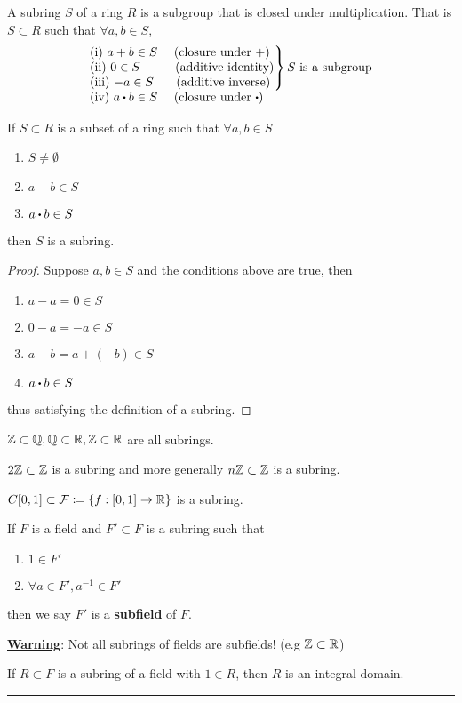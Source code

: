 \documentclass[../Main.tex]{subfiles}
\begin{document}
\begin{dfn}[title=Subring]
	A subring $S$ of a ring $R$ is a subgroup that is closed under multiplication. That is $S\subset R$ such that $\forall a,b \in S$,
	 \[\begin{tabular}{ l }
		$\left.\kern-\nulldelimiterspace
		\begin{tabular}{@{} l @{}}
		(i) $a + b \in S$ \quad (closure under $+$) \\
		(ii) $0 \in S$ \qquad\, (additive identity)                               \\
		(iii) $-a \in S$ \quad\, (additive inverse)
		\end{tabular}\right\} S \text{ is a subgroup}$ \\
		(iv) $a \rdot b \in S$ \quad  (closure under $\rdot$)
	\end{tabular}\]
\end{dfn}
\begin{prop}[title=Subring Criterion]
	If $S\subset R$ is a subset of a ring such that $\forall a,b \in S$ 
	\begin{enumerate}
		\item $S \ne \emptyset$
		\item $a-b \in S$
		\item $a\rdot b \in S$
	\end{enumerate}
	then $S$ is a subring.
\end{prop}
\begin{proof}
	Suppose $a,b\in S$ and the conditions above are true, then
	\begin{enumerate}
		\item $a-a=0\in S$
		\item $0-a=-a\in S$
		\item $a-b = a+(-b) \in S$
		\item $a\rdot b \in S$
	\end{enumerate}
	thus satisfying the definition of a subring.
\end{proof}
\begin{example}
	$\mathbb{Z} \subset \mathbb{Q}, \mathbb{Q} \subset \mathbb{R}, \mathbb{Z} \subset \mathbb{R}$ are all subrings.
\end{example}
\begin{example}
	$2\mathbb{Z} \subset \mathbb{Z}$ is a subring and more generally $n\mathbb{Z} \subset \mathbb{Z}$ is a subring.
\end{example}
\begin{example}
	$C[0,1] \subset \mathcal{F} \coloneqq \{f: [0,1]\to \mathbb{R}\}$ is a subring.
\end{example}
\begin{dfn}[title=Subfield]
	If $F$ is a field and $F' \subset F$ is a subring such that
	\begin{enumerate}
		\item $1 \in F'$
		\item $\forall a \in F', a^{-1} \in F'$
	\end{enumerate}
	then we say $F'$ is a \textbf{subfield} of $F$.
\end{dfn}
\textbf{\textcolor{BrickRed}{\underline{Warning}}}: Not all subrings of fields are subfields! (e.g $\mathbb{Z}\subset \mathbb{R}$)
\begin{claim}
	If $R \subset F$ is a subring of a field with $1\in R$, then $R$ is an integral domain.
\end{claim}
\noindent\rule{\textwidth}{1pt}
\end{document}
